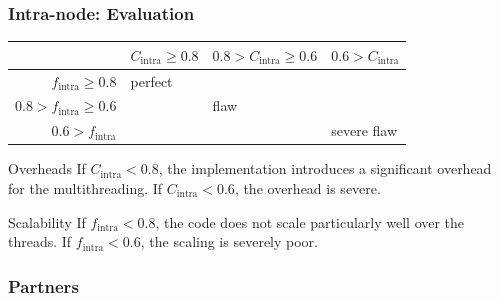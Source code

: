 \documentclass[8pt,t,pdflatex,notes]{beamer}
\begin{document}
\begin{frame}
  \frametitle{Intra-node: Evaluation}
  \vfill
\begin{center}
 \begin{tabular}{r|p{}p{}p{}}
  & $C_{\text{intra}}\geq 0.8$ & $0.8 > C_{\text{intra}}\geq 0.6$ & $0.6 > C_{\text{intra}}$ \\
  \hline
  $f_{\text{intra}} \geq 0.8$
   & \cellcolor{green!25} perfect
   & \cellcolor{orange!25}
   & \cellcolor{red!25}
  \\
  $0.8 > f_{\text{intra}} \geq 0.6$
   & \cellcolor{orange!25}
   & \cellcolor{orange!25} flaw
   & \cellcolor{red!25}
  \\
  $0.6 > f_{\text{intra}}$
   & \cellcolor{red!25}
   & \cellcolor{red!25}
   & \cellcolor{red!25} severe flaw
 \end{tabular}
\end{center}
\begin{citation-box}{Overheads}
 If $C_{\text{intra}}< 0.8$, the implementation introduces a significant overhead for the multithreading.
 If $C_{\text{intra}}< 0.6$, the overhead is severe.
\end{citation-box}


\begin{citation-box}{Scalability}
 If $f_{\text{intra}}< 0.8$, the code does not scale particularly well over the threads.
 If $f_{\text{intra}}< 0.6$, the scaling is severely poor.
\end{citation-box}
  \vfill
\end{frame}


\begin{frame}
 \frametitle{Partners}
 \vfill
 \vfill
\end{frame}
\end{document}
